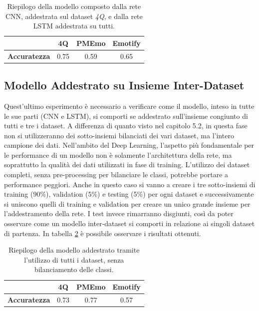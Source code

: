 \documentclass[11pt]{report}
\begin{document}
\vspace{1cm}


\begin{table}[h]
\caption{Riepilogo della modello composto dalla rete CNN, addestrata sul dataset \textit{4Q}, e dalla rete LSTM addestrata su tutti.}
\label{tab-es2}
\centering
\begin{tabular}{|c|c|c|c|}
\hline
&\textbf{4Q} &  \textbf{PMEmo} & \textbf{Emotify}\\
\hline
\textbf{Accuratezza} & 0.75  & 0.59 & 0.65\\
\hline
\end{tabular}
\end{table}


\newpage

\subsection{Modello Addestrato su Insieme Inter-Dataset}

Quest'ultimo esperimento è necessario a verificare come il modello, inteso in tutte le sue parti (CNN e LSTM), si comporti se addestrato sull'insieme congiunto di tutti e tre i dataset. A differenza di quanto visto nel capitolo 5.2, in questa fase non si utilizzeranno dei sotto-insiemi bilanciati dei vari dataset, ma l'intero campione dei dati. Nell'ambito del Deep Learning, l'aspetto più fondamentale per le performance di un modello non è solamente l'architettura della rete, ma soprattutto la qualità dei dati utilizzati in fase di training. L'utilizzo dei dataset completi, senza pre-processing per bilanciare le classi, potrebbe portare a performance peggiori. Anche in questo caso si vanno a creare i tre sotto-insiemi di training (90\%), validation (5\%) e testing (5\%) per ogni dataset e successivamente si uniscono quelli di training e validation per creare un unico grande insieme per l'addestramento della rete. I test invece rimarranno disgiunti, così da poter osservare come un modello inter-dataset si comporti in relazione ai singoli dataset di partenza. In tabella \ref{tab-es3} è possibile osservare i risultati ottenuti.

\vspace{1cm}

\begin{table}[h]
\caption{Riepilogo della modello addestrato tramite l'utilizzo di tutti i dataset, senza bilanciamento delle classi.}
\label{tab-es3}
\centering
\begin{tabular}{|c|c|c|c|}
\hline
&\textbf{4Q} &  \textbf{PMEmo} & \textbf{Emotify}\\
\hline
\textbf{Accuratezza} & 0.73  & 0.77 & 0.57\\
\hline
\end{tabular}
\end{table}
\end{document}
